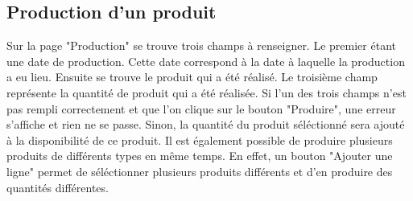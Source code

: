 \subsection{Production d'un produit}
Sur la page "Production" se trouve trois champs à renseigner. Le premier étant 
une date de production. Cette date correspond à la date à laquelle la production 
a eu lieu. Ensuite se trouve le produit qui a été réalisé. Le troisième champ 
représente la quantité de produit qui a été réalisée. Si l'un des trois champs 
n'est pas rempli correctement et que l'on clique sur le bouton "Produire", une 
erreur s'affiche et rien ne se passe. Sinon, la quantité du produit séléctionné 
sera ajouté à la disponibilité de ce produit. Il est également possible de 
produire plusieurs produits de différents types en même temps. En effet, un 
bouton "Ajouter une ligne" permet de séléctionner plusieurs produits différents 
et d'en produire des quantités différentes.
